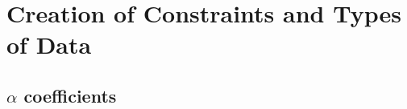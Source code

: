 




%
%
%
%
%

\section{Creation of Constraints and Types of Data}
\label{sec:Creation of Constraints:TKC}




\subsection{$\alpha$ coefficients}
\label{sec:alpha coefficients:TKC}


